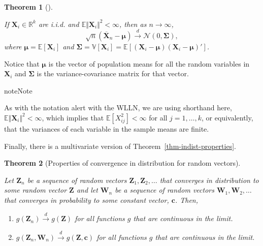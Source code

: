 \documentclass[
  13pt,
  letterpaper,
  DIV=11,
  numbers=noendperiod]{scrreprt}
\providecommand{\tightlist}{%
  \setlength{\itemsep}{0pt}\setlength{\parskip}{0pt}}
\newcommand{\mb}{\bm}
\newcommand{\E}{\mathbb{E}}
\newcommand{\V}{\mathbb{V}}
\newcommand{\N}{\mathcal{N}}
\newcommand{\X}{\mb{X}}
\newcommand{\indist}{\overset{d}{\to}}
\theoremstyle{plain}
\newtheorem{theorem}{Theorem}[chapter]
\theoremstyle{plain}
\theoremstyle{definition}
\theoremstyle{definition}
\theoremstyle{remark}
\begin{document}
\begin{theorem}[]\protect\hypertarget{thm-multivariate-clt}{}\label{thm-multivariate-clt}

If \(\mb{X}_i \in \mathbb{R}^k\) are i.i.d. and
\(\E\Vert \mb{X}_i \Vert^2 < \infty\), then as \(n \to \infty\), \[
\sqrt{n}\left( \overline{\mb{X}}_n - \mb{\mu}\right) \indist \N(0, \mb{\Sigma}),
\] where \(\mb{\mu} = \E[\mb{X}_i]\) and
\(\mb{\Sigma} = \V[\mb{X}_i] = \E\left[(\mb{X}_i-\mb{\mu})(\mb{X}_i - \mb{\mu})'\right]\).

\end{theorem}

Notice that \(\mb{\mu}\) is the vector of population means for all the
random variables in \(\X_i\) and \(\mb{\Sigma}\) is the
variance-covariance matrix for that vector.

\begin{bookcallout}{note}{Note}

As with the notation alert with the WLLN, we are using shorthand here,
\(\E\Vert \mb{X}_i \Vert^2 < \infty\), which implies that
\(\E[X_{ij}^2] < \infty\) for all \(j = 1,\ldots, k\), or equivalently,
that the variances of each variable in the sample means are finite.

\end{bookcallout}

Finally, there is a multivariate version of
Theorem~\ref{thm-indist-properties}.

\begin{theorem}[Properties of convergence in distribution for random
vectors]\protect\hypertarget{thm-indist-properties-multivariate}{}\label{thm-indist-properties-multivariate}

Let \(\mb{Z}_n\) be a sequence of random vectors
\(\mb{Z}_1, \mb{Z}_2,\ldots\) that converges in distribution to some
random vector \(\mb{Z}\) and let \(\mb{W}_n\) be a sequence of random
vectors \(\mb{W}_1, \mb{W}_2,\ldots\) that converges in probability to
some constant vector, \(\mb{c}\). Then,

\begin{enumerate}
\def\labelenumi{\arabic{enumi}.}
\tightlist
\item
  \(g(\mb{Z}_n) \indist g(\mb{Z})\) for all functions \(g\) that are
  continuous in the limit.
\item
  \(g(\mb{Z}_n, \mb{W}_n) \indist g(\mb{Z}, \mb{c})\) for all functions
  \(g\) that are continuous in the limit.
\end{enumerate}

\end{theorem}
\end{document}

